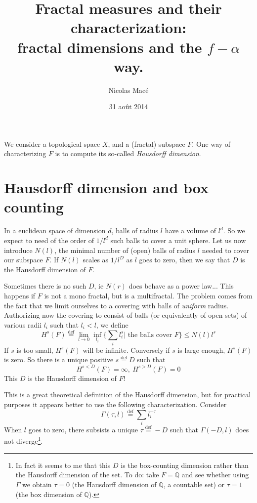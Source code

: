 \documentclass[11pt]{article}
\title{\textbf{Fractal measures and their characterization:} \\ fractal dimensions and the $f-\alpha$ way.}
\author{Nicolas Macé}
\date{31 août 2014}
\newcommand{\define}{\ensuremath{ \overset{\text{def}}{=} }}
\begin{document}

\maketitle

We consider a topological space $X$, and a (fractal) subspace $F$.
One way of characterizing $F$ is to compute its so-called \emph{Hausdorff dimension}.

\section{Hausdorff dimension and box counting}

In a euclidean space of dimension $d$, balls of radius $l$ have a volume of $l^d$.
So we expect to need of the order of $1/l^d$ such balls to cover a unit sphere. 
Let us now introduce $N(l)$, the minimal number of (open) balls of radius $l$ needed to cover our subspace $F$. If $N(l)$ scales as $1/l^D$ as $l$ goes to zero, then we say that $D$ is the Hausdorff dimension of $F$.

Sometimes there is no such $D$, ie $N(r)$ does behave as a power law... This happens if $F$ is not a mono fractal, but is a multifractal.
The problem comes from the fact that we limit ourselves to a covering with balls of \emph{uniform} radius. Authorizing now the covering to consist of balls (or equivalently of open sets) of various radii $l_i$ such that  $l_i < l$, we define
\begin{equation}
	H^s(F) \define \lim_{l \rightarrow 0} \inf_{l_i} \Big\{ \sum_i l_i^s \Big| \text{~the balls cover $F$} \Big\} \leq N(l) l^s
\end{equation}
If $s$ is too small, $H^s(F)$ will be infinite. Conversely if $s$ is large enough, $H^s(F)$ is zero. So there is a unique positive $s \define D$ such that 
\begin{equation}
	H^{s < D}(F) = \infty, ~ H^{s > D}(F) = 0
\end{equation}
This $D$ is the Hausdorff dimension of $F$!

This is a great theoretical definition of the Hausdorff dimension, but for practical purposes it appears better to use the following characterization. Consider
\begin{equation}
	\Gamma(\tau,l) \define \sum_i l_i^{-\tau}
\end{equation}
When $l$ goes to zero, there subsists a unique $\tau \define -D$ such that $\Gamma(-D,l)$ does not diverge\footnote{In fact it seems to me that this $D$ is the box-counting dimension rather than the Hausdorff dimension of the set. To do: take $F = \mathbb{Q}$ and see whether using $\Gamma$ we obtain $\tau=0$ (the Hausdorff dimension of $\mathbb{Q}$, a countable set) or $\tau=1$ (the box dimension of $\mathbb{Q}$).}.
\end{document}
